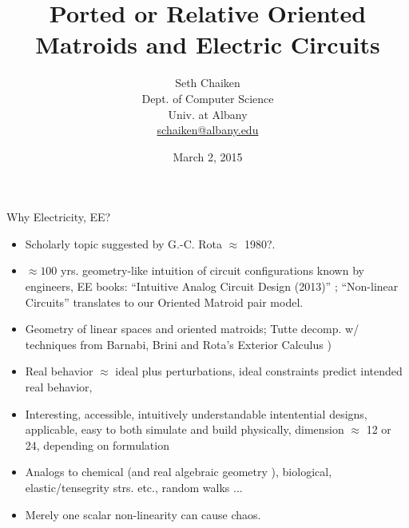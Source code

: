\documentclass{beamer}
\title{Ported or Relative Oriented Matroids and Electric Circuits}
\author{Seth Chaiken\\
Dept. of Computer Science\\
Univ. at Albany\\
\url{schaiken@albany.edu}
}
\date{March 2, 2015}
\newcommand{\Remph}[1]{{\color{red}#1}}
\begin{document}
\begin{frame}
 \titlepage
\end{frame}


\begin{frame}{Why Electricity, EE?}
\begin{itemize}
\item Scholarly topic suggested by G.-C. Rota $\approx$ 1980?.
\item $\approx 100$ yrs. geometry-like intuition of
circuit configurations known by engineers, EE books:
\Remph{``Intuitive Analog Circuit Design (2013)''
\cite{intuitAna}}; ``Non-linear Circuits'' \cite{HaslerNeirynck}
translates to our Oriented Matroid pair model.

\item Geometry of linear spaces and oriented matroids;
Tutte decomp. w/
techniques from Barnabi, Brini and Rota's Exterior Calculus 
\cite{exteriorCalc})

\item
Real behavior $\approx$ ideal plus perturbations,
ideal constraints predict intended real behavior,

\item 
Interesting, accessible, intuitively understandable
intentential designs, applicable,
easy to both simulate and build physically, dimension
$\approx$
12 or 24, depending on formulation
\item
Analogs to chemical (and real algebraic geometry 
\cite{signsInChemRAG}), biological, \Remph{elastic/tensegrity strs.} etc., 
random walks ...
\item
Merely one scalar non-linearity can cause chaos.
\end{itemize}
\end{frame}
\end{document}
